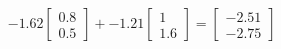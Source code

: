 \documentclass[preview]{standalone}
\begin{document}
\begin{align*}
-1.62 \begin{bmatrix} 0.8 \\ 0.5 \end{bmatrix} + -1.21 \begin{bmatrix} 1 \\ 1.6 \end{bmatrix} = \begin{bmatrix} -2.51 \\ -2.75 \end{bmatrix}
\end{align*}
\end{document}
